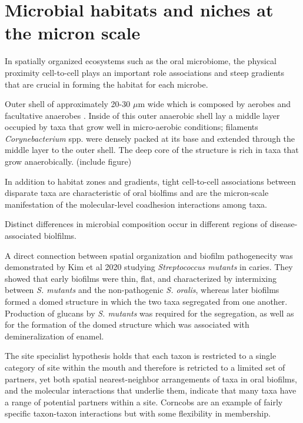 \section{Microbial habitats and niches at the micron scale}
In spatially organized ecosystems such as the oral microbiome, the physical proximity cell-to-cell plays an important 
role associations and steep gradients that are crucial in forming the habitat for each microbe.

\begin{definition}[Hedgehog]
    Outer shell of approximately 20-30 $\mu$m wide which is composed by aerobes and facultative anaerobes \cite{Welch2020}.
    Inside of this outer anaerobic shell lay a middle layer occupied by taxa that grow well in micro-aerobic conditions;
    filaments \textit{Corynebacterium} spp. were densely packed at its base and extended through the middle layer to the 
    outer shell. The deep core of the structure is rich in taxa that grow anaerobically. (include figure)
\end{definition}


In addition to habitat zones and gradients, tight cell-to-cell associations between disparate taxa are characteristic of 
oral biolfims and are the micron-scale manifestation of the molecular-level coadhesion interactions among taxa.

Distinct differences in microbial composition occur in different regions of disease-associated biolfilms.

A direct connection between spatial organization and biofilm pathogenecity was demonstrated by Kim et al 2020 studying 
\textit{Streptococcus mutants} in caries. They showed that early biofilms were thin, flat, and characterized by intermixing 
between \textit{S. mutants} and the non-pathogenic \textit{S. oralis}, whereas later biofilms formed a domed structure in 
which the two taxa segregated from one another. Production of glucans by \textit{S. mutants} was required for the segregation, 
as well as for the formation of the domed structure which was associated with demineralization of enamel.

The site specialist hypothesis holds that each taxon is restricted to a single category of site within the mouth and therefore 
is retricted to a limited set of partners, yet both spatial nearest-neighbor arrangements of taxa in oral biofilms, and 
the molecular interactions that underlie them, indicate that many taxa have a range of potential partners within a site. 
Corncobs are an example of fairly specific taxon-taxon interactions but with some flexibility in membership.

